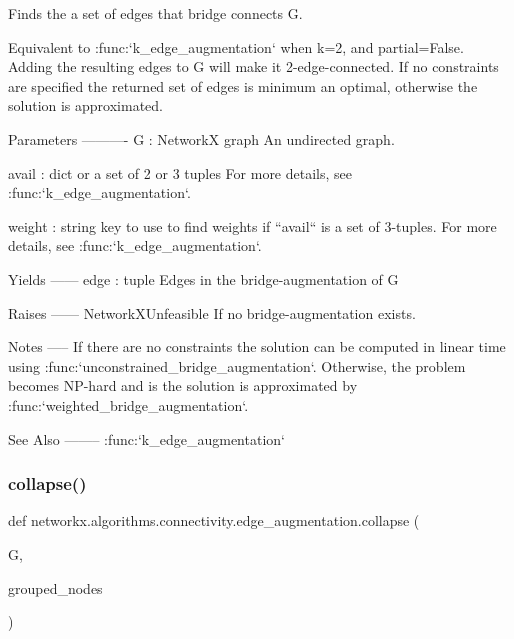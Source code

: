 \begin{DoxyVerb}Finds the a set of edges that bridge connects G.

Equivalent to :func:`k_edge_augmentation` when k=2, and partial=False.
Adding the resulting edges to G will make it 2-edge-connected.  If no
constraints are specified the returned set of edges is minimum an optimal,
otherwise the solution is approximated.

Parameters
----------
G : NetworkX graph
   An undirected graph.

avail : dict or a set of 2 or 3 tuples
    For more details, see :func:`k_edge_augmentation`.

weight : string
    key to use to find weights if ``avail`` is a set of 3-tuples.
    For more details, see :func:`k_edge_augmentation`.

Yields
------
edge : tuple
    Edges in the bridge-augmentation of G

Raises
------
NetworkXUnfeasible
    If no bridge-augmentation exists.

Notes
-----
If there are no constraints the solution can be computed in linear time
using :func:`unconstrained_bridge_augmentation`. Otherwise, the problem
becomes NP-hard and is the solution is approximated by
:func:`weighted_bridge_augmentation`.

See Also
--------
:func:`k_edge_augmentation`
\end{DoxyVerb}
 \mbox{\label{namespacenetworkx_1_1algorithms_1_1connectivity_1_1edge__augmentation_a79eb970749b4a6d840dd1f23fb2f0a43}} 
\subsubsection{\texorpdfstring{collapse()}{collapse()}}
{\footnotesize\ttfamily def networkx.\+algorithms.\+connectivity.\+edge\+\_\+augmentation.\+collapse (\begin{DoxyParamCaption}\item[{}]{G,  }\item[{}]{grouped\+\_\+nodes }\end{DoxyParamCaption})}

